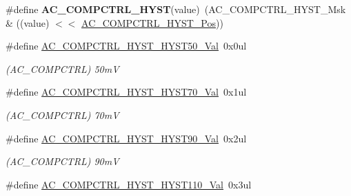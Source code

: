 \begin{DoxyCompactItemize}
\item 
\hypertarget{group___s_a_m_l21___a_c_gaa0b57f32a7f896ed295f4a60f832341c}{}\#define {\bfseries A\+C\+\_\+\+C\+O\+M\+P\+C\+T\+R\+L\+\_\+\+H\+Y\+S\+T}(value)~(A\+C\+\_\+\+C\+O\+M\+P\+C\+T\+R\+L\+\_\+\+H\+Y\+S\+T\+\_\+\+Msk \& ((value) $<$$<$ \hyperlink{group___s_a_m_l21___a_c_ga080eedbd8cdba82fc0d24013941b523b}{A\+C\+\_\+\+C\+O\+M\+P\+C\+T\+R\+L\+\_\+\+H\+Y\+S\+T\+\_\+\+Pos}))\label{group___s_a_m_l21___a_c_gaa0b57f32a7f896ed295f4a60f832341c}

\item 
\hypertarget{group___s_a_m_l21___a_c_gad32217a0763207fb52502050a20cc73a}{}\#define \hyperlink{group___s_a_m_l21___a_c_gad32217a0763207fb52502050a20cc73a}{A\+C\+\_\+\+C\+O\+M\+P\+C\+T\+R\+L\+\_\+\+H\+Y\+S\+T\+\_\+\+H\+Y\+S\+T50\+\_\+\+Val}~0x0ul\label{group___s_a_m_l21___a_c_gad32217a0763207fb52502050a20cc73a}

\begin{DoxyCompactList}\small\item\em (A\+C\+\_\+\+C\+O\+M\+P\+C\+T\+R\+L) 50m\+V \end{DoxyCompactList}\item 
\hypertarget{group___s_a_m_l21___a_c_ga06c3e12b61178373b3f0f8b1548be100}{}\#define \hyperlink{group___s_a_m_l21___a_c_ga06c3e12b61178373b3f0f8b1548be100}{A\+C\+\_\+\+C\+O\+M\+P\+C\+T\+R\+L\+\_\+\+H\+Y\+S\+T\+\_\+\+H\+Y\+S\+T70\+\_\+\+Val}~0x1ul\label{group___s_a_m_l21___a_c_ga06c3e12b61178373b3f0f8b1548be100}

\begin{DoxyCompactList}\small\item\em (A\+C\+\_\+\+C\+O\+M\+P\+C\+T\+R\+L) 70m\+V \end{DoxyCompactList}\item 
\hypertarget{group___s_a_m_l21___a_c_ga03b4afa21a30a1aa772fa4b81f800f99}{}\#define \hyperlink{group___s_a_m_l21___a_c_ga03b4afa21a30a1aa772fa4b81f800f99}{A\+C\+\_\+\+C\+O\+M\+P\+C\+T\+R\+L\+\_\+\+H\+Y\+S\+T\+\_\+\+H\+Y\+S\+T90\+\_\+\+Val}~0x2ul\label{group___s_a_m_l21___a_c_ga03b4afa21a30a1aa772fa4b81f800f99}

\begin{DoxyCompactList}\small\item\em (A\+C\+\_\+\+C\+O\+M\+P\+C\+T\+R\+L) 90m\+V \end{DoxyCompactList}\item 
\hypertarget{group___s_a_m_l21___a_c_gaac0bfb99137707c74ec43fa21863594b}{}\#define \hyperlink{group___s_a_m_l21___a_c_gaac0bfb99137707c74ec43fa21863594b}{A\+C\+\_\+\+C\+O\+M\+P\+C\+T\+R\+L\+\_\+\+H\+Y\+S\+T\+\_\+\+H\+Y\+S\+T110\+\_\+\+Val}~0x3ul\label{group___s_a_m_l21___a_c_gaac0bfb99137707c74ec43fa21863594b}


\end{DoxyCompactItemize}
